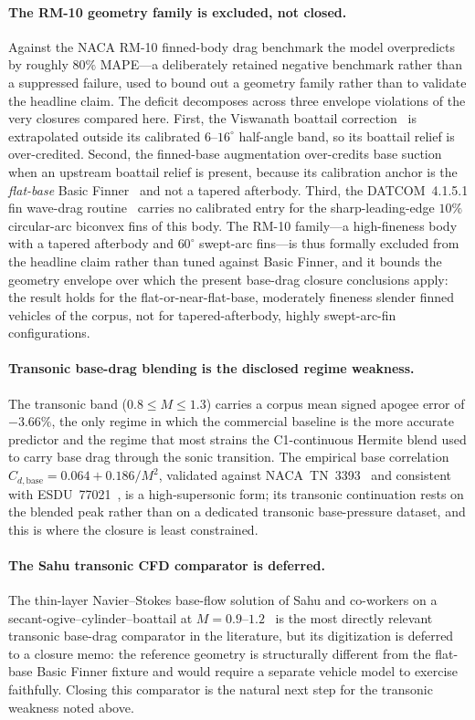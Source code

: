 \paragraph{The RM-10 geometry family is excluded, not closed.}
Against the NACA RM-10 finned-body drag benchmark the model overpredicts by
roughly $80\%$ MAPE---a deliberately retained negative benchmark rather than a
suppressed failure, used to bound out a geometry family rather than to validate
the headline claim. The deficit decomposes across three envelope violations of
the very closures compared here. First, the Viswanath boattail
correction~\cite{viswanath1996} is extrapolated outside its calibrated
$6$--$16^{\circ}$ half-angle band, so its boattail relief is over-credited.
Second, the finned-base augmentation over-credits base suction when an upstream
boattail relief is present, because its calibration anchor is the
\emph{flat-base} Basic Finner~\cite{dupuis1997} and not a tapered afterbody.
Third, the DATCOM~4.1.5.1 fin wave-drag routine~\cite{datcom1978} carries no
calibrated entry for the sharp-leading-edge $10\%$ circular-arc biconvex fins of
this body. The RM-10 family---a high-fineness body with a tapered afterbody and
$60^{\circ}$ swept-arc fins---is thus formally excluded from the headline claim
rather than tuned against Basic Finner, and it bounds the geometry envelope over
which the present base-drag closure conclusions apply: the result holds for the
flat-or-near-flat-base, moderately fineness slender finned vehicles of the
corpus, not for tapered-afterbody, highly swept-arc-fin configurations.

\paragraph{Transonic base-drag blending is the disclosed regime weakness.}
The transonic band ($0.8 \le M \le 1.3$) carries a corpus mean signed apogee
error of $-3.66\%$, the only regime in which the commercial baseline is the more
accurate predictor and the regime that most strains the C1-continuous Hermite
blend used to carry base drag through the sonic transition. The empirical base
correlation $C_{d,\text{base}} = 0.064 + 0.186/M^2$, validated against
NACA~TN~3393~\cite{chapman1955} and consistent with ESDU~77021~\cite{esdu77021},
is a high-supersonic form; its transonic continuation rests on the blended peak
rather than on a dedicated transonic base-pressure dataset, and this is where
the closure is least constrained.

\paragraph{The Sahu transonic CFD comparator is deferred.}
The thin-layer Navier--Stokes base-flow solution of Sahu and co-workers on a
secant-ogive--cylinder--boattail at $M = 0.9$--$1.2$~\cite{sahu1983} is the most
directly relevant transonic base-drag comparator in the literature, but its
digitization is deferred to a closure memo: the reference geometry is
structurally different from the flat-base Basic Finner fixture and would require
a separate vehicle model to exercise faithfully. Closing this comparator is the
natural next step for the transonic weakness noted above.

